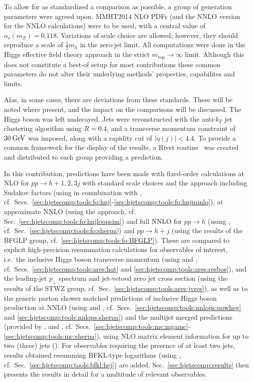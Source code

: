 To allow for as standardized a comparison as possible, a group of
generation parameters were agreed upon. MMHT2014 NLO PDFs (and the
NNLO version for the NNLO calculations) were to be used, with a
central value of $\alpha_\mathrm{s}(m_Z)=0.118$.  
Variations of scale choice are allowed; however, they
should reproduce a scale of $\tfrac{1}{2}m_h$ in the zero-jet limit. 
All computations were done in the Higgs effective field theory approach 
in the strict $m_\text{top}\to\infty$ limit. Although this does not constitute 
a best-of setup for most contributions these common parameters do not 
alter their underlying methods' properties, capabilites and limits.

Alas, in some cases, there are deviations from these standards. These
will be noted where present, and the impact on the comparisons will be
discussed.  The Higgs boson was left undecayed. Jets were reconstructed 
with the anti-$k_T$ jet clustering algorithm \cite{Cacciari:2008gp} using
$R=0.4$, and a transverse momentum constraint of $30\text{\:GeV}$ was imposed,
along with a rapidity cut of $|\eta(j)|<4.4$.  To provide a common
framework for the display of the results, a Rivet
routine~\cite{Buckley:2010ar,webpage} was created and distributed to each group
providing a prediction.

In this contribution, predictions have been made with fixed-order
calculations at NLO for $pp\to h+1,2,3j$ with standard scale choices 
and the \hjetscompMinlo approach including Sudakov factors (using \hjetscompGoSam in 
comnbination with \hjetscompSherpa, cf.\ Secs.\ 
\ref{sec:hjetscomp:tools:fo:hnj}-\ref{sec:hjetscomp:tools:fo:hnjminlo}), 
at approximate NNLO (using the \hjetscompLoopsim approach, cf. Sec.\ 
\ref{sec:hjetscomp:tools:fo:hnjloopsim}) and full NNLO for $pp\to h$ 
(using \hjetscompSherpa, cf.\ Sec.\ \ref{sec:hjetscomp:tools:fo:sherpa}) and 
$pp\to h+j$ (using the results of the BFGLP group, cf.\ 
\ref{sec:hjetscomp:tools:fo:BFGLP}). These are compared to explicit 
high-precision resummation calculations for observables of interest, 
i.e.\ the inclusive Higgs boson transverse momentum (using \hjetscompHqT and \hjetscompResbos, cf.\ 
Secs.\ \ref{sec:hjetscomp:tools:ares:hqt} and 
\ref{sec:hjetscomp:tools:ares:resbos}), and the leading-jet $p_\perp$ spectrum 
and jet-vetoed zero jet 
cross section (using the results of the STWZ group, cf.\ Sec.\ 
\ref{sec:hjetscomp:tools:ares:jvres}), as well as to the generic 
parton shower matched predictions of inclusive Higgs boson production 
at NNLO (using \hjetscompPowheg and \hjetscompSherpa, cf.\ Secs.\ 
\ref{sec:hjetscomp:tools:nnlops:powheg} and 
\ref{sec:hjetscomp:tools:nnlops:sherpa}) and the multijet merged 
predictions (provided by \hjetscompMGaMC, \hjetscompHerwig and \hjetscompSherpa, cf.\ Secs.\ 
\ref{sec:hjetscomp:tools:mc:mgamc}-\ref{sec:hjetscomp:tools:mc:sherpa}), 
using NLO matrix element information for up to two (three) jets (\hjetscompSherpa). 
For observables requiring the presence of at least two jets, results 
obtained resumming BFKL-type logarithms (using \hjetscompHej, cf.\ Sec.\ 
\ref{sec:hjetscomp:tools:bfkl:hej}) are added. 
Sec.\ \ref{sec:hjetscomp:results} then presents the results in detail 
for a multitude of relevant observables.
